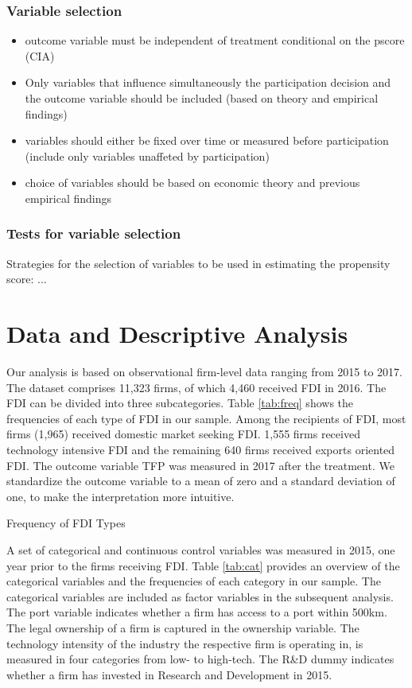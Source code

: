 \documentclass[a4paper,11pt]{scrartcl}
\begin{document}
{\subsubsection*{Variable selection}
\begin{itemize}
\item outcome variable must be independent of treatment conditional on the pscore (CIA)
\item Only variables that influence simultaneously the participation decision and the outcome variable should be included (based on theory and empirical findings)
\item variables should either be fixed over time or measured before participation (include only variables unaffeted by participation)
\item choice of variables should be based on economic theory and previous empirical findings
\end{itemize}

\subsubsection*{Tests for variable selection}
Strategies for the selection of variables to be used in estimating the propensity score: ...
}

\section{Data and Descriptive Analysis}
Our analysis is based on observational firm-level data ranging from 2015 to 2017. The dataset comprises 11,323 firms, of which 4,460 received FDI in 2016. The FDI can be divided into three subcategories. Table \ref{tab:freq} shows the frequencies of each type of FDI in our sample. Among the recipients of FDI, most firms (1,965) received domestic market seeking FDI. 1,555 firms received technology intensive FDI and the remaining 640 firms received exports oriented FDI. The outcome variable TFP was measured in 2017 after the treatment. We standardize the outcome variable to a mean of zero and a standard deviation of one, to make the interpretation more intuitive. 

\begin{table}[h!]
	\centering
	\caption{Frequency of FDI Types} 
	
\label{tab:freq}
\end{table}

A set of categorical and continuous control variables was measured in 2015, one year prior to the firms receiving FDI. Table \ref{tab:cat} provides an overview of the categorical variables and the frequencies of each category in our sample. The categorical variables are included as factor variables in the subsequent analysis. The port variable indicates whether a firm has access to a port within 500km. The legal ownership of a firm is captured in the ownership variable. The technology intensity of the industry the respective firm is operating in, is measured in four categories from low- to high-tech. The R\&D dummy indicates whether a firm has invested in Research and Development in 2015. \\
\end{document}
